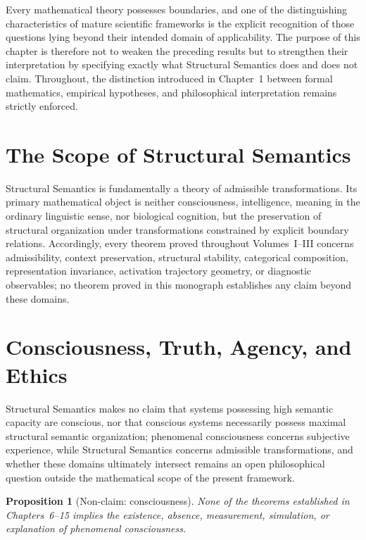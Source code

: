 \documentclass[11pt,twoside,openright]{book}
\numberwithin{equation}{chapter}
\theoremstyle{definition}
\theoremstyle{plain}
\newtheorem{proposition}[definition]{Proposition}
\theoremstyle{remark}
\theoremstyle{definition}
\begin{document}
Every mathematical theory possesses boundaries, and one of the
distinguishing characteristics of mature scientific frameworks is the
explicit recognition of those questions lying beyond their intended
domain of applicability. The purpose of this chapter is therefore not to
weaken the preceding results but to strengthen their interpretation by
specifying exactly what Structural Semantics does and does not claim.
Throughout, the distinction introduced in Chapter~1 between formal
mathematics, empirical hypotheses, and philosophical interpretation
remains strictly enforced.

\section{The Scope of Structural Semantics}

Structural Semantics is fundamentally a theory of admissible
transformations. Its primary mathematical object is neither
consciousness, intelligence, meaning in the ordinary linguistic sense,
nor biological cognition, but the preservation of structural organization
under transformations constrained by explicit boundary relations.
Accordingly, every theorem proved throughout Volumes~I--III concerns
admissibility, context preservation, structural stability, categorical
composition, representation invariance, activation trajectory geometry,
or diagnostic observables; no theorem proved in this monograph establishes
any claim beyond these domains.

\section{Consciousness, Truth, Agency, and Ethics}

Structural Semantics makes no claim that systems possessing high semantic
capacity are conscious, nor that conscious systems necessarily possess
maximal structural semantic organization; phenomenal consciousness
concerns subjective experience, while Structural Semantics concerns
admissible transformations, and whether these domains ultimately
intersect remains an open philosophical question outside the mathematical
scope of the present framework.

\begin{proposition}[Non-claim: consciousness]
None of the theorems established in Chapters~6--15 implies the existence,
absence, measurement, simulation, or explanation of phenomenal
consciousness.
\end{proposition}
\end{document}

